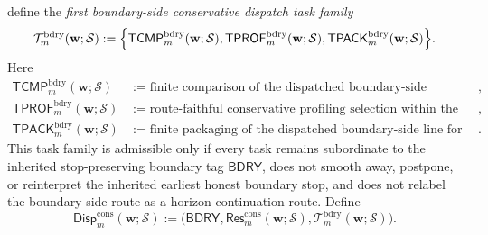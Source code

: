\begin{definition}
\begin{enumerate}[label=(\roman*)]
\[  \]
  define the \emph{first boundary-side conservative dispatch task family}
  \[
    \mathcal T^{\mathrm{bdry}}_{m}(\mathbf w;\mathcal S)
    :=
    \Bigl\{
      \mathsf{TCMP}^{\mathrm{bdry}}_{m}(\mathbf w;\mathcal S),
      \mathsf{TPROF}^{\mathrm{bdry}}_{m}(\mathbf w;\mathcal S),
      \mathsf{TPACK}^{\mathrm{bdry}}_{m}(\mathbf w;\mathcal S)
    \Bigr\}.
  \]
  Here
  \begin{align*}
    \mathsf{TCMP}^{\mathrm{bdry}}_{m}(\mathbf w;\mathcal S) &:= \text{finite comparison of the dispatched boundary-side conservative fulfillment family},\\
    \mathsf{TPROF}^{\mathrm{bdry}}_{m}(\mathbf w;\mathcal S) &:= \text{route-faithful conservative profiling selection within the inherited boundary-side line},\\
    \mathsf{TPACK}^{\mathrm{bdry}}_{m}(\mathbf w;\mathcal S) &:= \text{finite packaging of the dispatched boundary-side line for later OP-facing reuse}.
  \end{align*}
  This task family is admissible only if every task remains subordinate to the inherited stop-preserving boundary tag \(\mathsf{BDRY}\), does not smooth away, postpone, or reinterpret the inherited earliest honest boundary stop, and does not relabel the boundary-side route as a horizon-continuation route. Define
  \[
    \mathsf{Disp}^{\mathrm{cons}}_{m}(\mathbf w;\mathcal S)
    :=
    \bigl(\mathsf{BDRY},\mathsf{Res}^{\mathrm{cons}}_{m}(\mathbf w;\mathcal S),\mathcal T^{\mathrm{bdry}}_{m}(\mathbf w;\mathcal S)\bigr).
  \]
\end{enumerate}
\end{definition}

